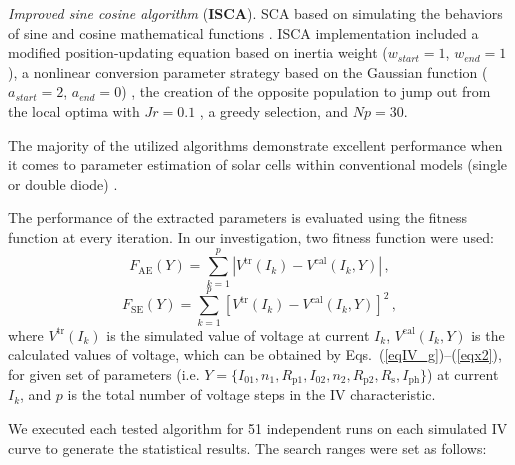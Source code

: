 \documentclass[a4paper,fleqn]{cas-dc}
\begin{document}
\emph{Improved sine cosine algorithm} (\textbf{ISCA}).
SCA based on simulating the behaviors of sine and cosine mathematical functions \cite{SCA}.
ISCA implementation included a modified position-updating equation based on inertia weight
($w_{start}=1$, $w_{end}=1$),
a nonlinear conversion parameter strategy based on the Gaussian function
($a_{start}=2$, $a_{end}=0$) \cite{ISCA2},
the creation of the opposite population to jump out from the local optima with $J\!r=0.1$ \cite{ISCA3},
a greedy selection, and $N\!p=30$.

The majority of the utilized algorithms demonstrate excellent performance when
it comes to parameter estimation of solar cells within conventional models (single or double diode) \cite{CWOA,DEWang,GOTLBO,IJAYA,MABC,PSO,STLBO,TLBO_Patel,LSHADE,IWOA}.

The performance of the extracted parameters is evaluated using the fitness function at
every iteration.
In our investigation, two fitness function were used:
\begin{equation}
\label{eqFae}
F_\mathrm{AE}(Y)= \sum_{k=1}^p \left|V^\mathrm{tr}(I_k)-V^\mathrm{cal}(I_k,Y)\right|\,,
\end{equation}
\begin{equation}
\label{eqFse}
F_\mathrm{SE}(Y)= \sum_{k=1}^p \left[V^\mathrm{tr}(I_k)-V^\mathrm{cal}(I_k,Y)\right]^2\,,
\end{equation}
where
$V^\mathrm{tr}(I_k)$ is the simulated value of voltage at current $I_k$,
$V^\mathrm{cal}(I_k,Y)$ is the calculated values of voltage, which can be obtained
by Eqs.~(\ref{eqIV_g})--(\ref{eqx2}),
for given set of parameters (i.e. $Y = \{I_{01},n_1,R_\mathrm{p1},I_{02},n_2,R_\mathrm{p2},R_\mathrm{s},I_\mathrm{ph}\}$)
at current $I_k$,
and $p$ is the total number of voltage steps in the IV characteristic.



We executed each tested algorithm for 51 independent runs on each simulated IV curve
to generate the statistical results.
The search ranges were set as follows:
\end{document}
